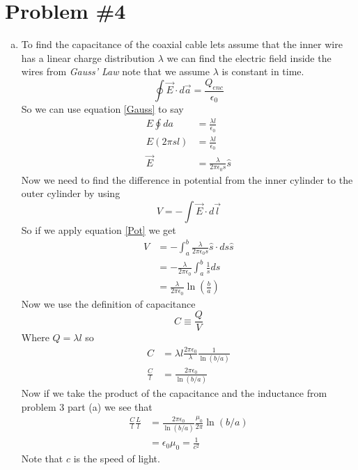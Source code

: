 \documentclass[11pt]{article}
\numberwithin{equation}{section}
\begin{document}
\section{Problem \#4}
\begin{enumerate}[(a)]
\item
To find the capacitance of the coaxial cable lets assume that the inner wire has a linear charge distribution $\lambda$ we can find the electric field inside the wires from \emph{Gauss' Law} note that we assume $\lambda$ is constant in time.
\begin{equation}
\oint\vec{E}\cdot d\vec{a} = \frac{Q_{enc}}{\epsilon_0}
\label{Gauss}
\end{equation}
So we can use equation \ref{Gauss} to say
\begin{align*}
E\oint da &= \frac{\lambda l}{\epsilon_0}\\
E(2\pi s l) &= \frac{\lambda l}{\epsilon_0}\\
\vec{E} &= \frac{\lambda}{2\pi\epsilon_0 s}\hat{s}
\end{align*}
Now we need to find the difference in potential from the inner cylinder to the outer cylinder by using 
\begin{equation}
V = -\int\vec{E}\cdot d\vec{l}
\label{Pot}
\end{equation}
So if we apply equation \ref{Pot} we get
\begin{align*}
V &= -\int_a^b\frac{\lambda}{2\pi\epsilon_0 s}\hat{s}\cdot ds\hat{s}\\
&= -\frac{\lambda}{2\pi\epsilon_0}\int_a^b\frac{1}{s}ds\\
&= \frac{\lambda}{2\pi\epsilon_0}\ln\left(\frac{b}{a}\right)
\end{align*}
Now we use the definition of capacitance 
\begin{equation}
C\equiv\frac{Q}{V}
\label{Capac}
\end{equation}
Where $Q=\lambda l$ so
\begin{align*}
C &= \lambda l\frac{2\pi\epsilon_0}{\lambda}\frac{1}{\ln(b/a)}\\
\frac{C}{l} &= \frac{2\pi\epsilon_0}{\ln(b/a)}
\end{align*}
Now if we take the product of the capacitance and the inductance from problem 3 part (a) we see that
\begin{align*}
\frac{C}{l}\frac{L}{l} &= \frac{2\pi\epsilon_0}{\ln(b/a)}\frac{\mu_0}{2\pi}\ln(b/a)\\
&= \epsilon_0\mu_0 = \frac{1}{c^2}
\end{align*}
Note that $c$ is the speed of light.


\end{enumerate}
\end{document}
